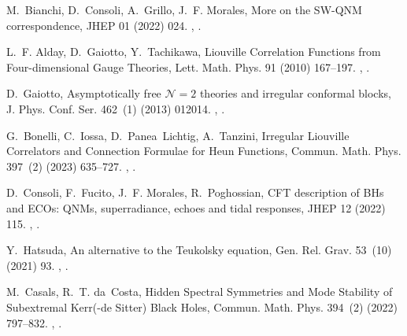 \documentclass[11pt,a4paper]{elsarticle}
\numberwithin{figure}{section}
\numberwithin{table}{section}
\begin{document}
\begin{thebibliography}{10}
M.~Bianchi, D.~Consoli, A.~Grillo, J.~F. Morales, {More on the SW-QNM
  correspondence}, JHEP 01 (2022) 024.
\newblock \href {http://arxiv.org/abs/2109.09804} {},
  \href {https://doi.org/10.1007/JHEP01(2022)024}
  {}.

L.~F. Alday, D.~Gaiotto, Y.~Tachikawa, {Liouville Correlation Functions from
  Four-dimensional Gauge Theories}, Lett. Math. Phys. 91 (2010) 167--197.
\newblock \href {http://arxiv.org/abs/0906.3219} {},
  \href {https://doi.org/10.1007/s11005-010-0369-5}
  {}.

D.~Gaiotto, {Asymptotically free $\mathcal{N} = 2$ theories and irregular
  conformal blocks}, J. Phys. Conf. Ser. 462~(1) (2013) 012014.
\newblock \href {http://arxiv.org/abs/0908.0307} {},
  \href {https://doi.org/10.1088/1742-6596/462/1/012014}
  {}.

G.~Bonelli, C.~Iossa, D.~Panea~Lichtig, A.~Tanzini, {Irregular Liouville
  Correlators and Connection Formulae for Heun Functions}, Commun. Math. Phys.
  397~(2) (2023) 635--727.
\newblock \href {http://arxiv.org/abs/2201.04491} {},
  \href {https://doi.org/10.1007/s00220-022-04497-5}
  {}.

D.~Consoli, F.~Fucito, J.~F. Morales, R.~Poghossian, {CFT description of BHs
  and ECOs: QNMs, superradiance, echoes and tidal responses}, JHEP 12 (2022)
  115.
\newblock \href {http://arxiv.org/abs/2206.09437} {},
  \href {https://doi.org/10.1007/JHEP12(2022)115}
  {}.

Y.~Hatsuda, {An alternative to the Teukolsky equation}, Gen. Rel. Grav. 53~(10)
  (2021) 93.
\newblock \href {http://arxiv.org/abs/2007.07906} {},
  \href {https://doi.org/10.1007/s10714-021-02866-4}
  {}.

M.~Casals, R.~T. da~Costa, {Hidden Spectral Symmetries and Mode Stability of
  Subextremal Kerr(-de Sitter) Black Holes}, Commun. Math. Phys. 394~(2) (2022)
  797--832.
\newblock \href {http://arxiv.org/abs/2105.13329} {},
  \href {https://doi.org/10.1007/s00220-022-04410-0}
  {}.


\end{thebibliography}
\end{document}
